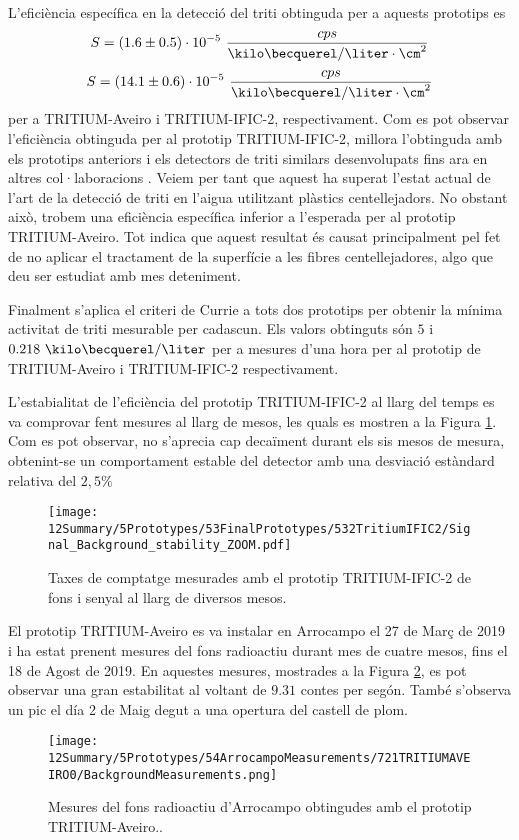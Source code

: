 L'eficiència específica en la detecció del triti obtinguda per a aquests prototips es
$$S = (1.6 \pm 0.5)\cdot{} 10^{-5}~\frac{cps}{\kilo\becquerel/\liter \cdot{} \cm^{2}}$$
$$S = (14.1 \pm 0.6)\cdot{} 10^{-5}~\frac{cps}{\kilo\becquerel/\liter \cdot{} \cm^{2}}$$
per a TRITIUM-Aveiro i TRITIUM-IFIC-2, respectivament. Com es pot observar l'eficiència obtinguda per al prototip TRITIUM-IFIC-2, millora l'obtinguda amb els prototips anteriors i els detectors de triti similars desenvolupats fins ara en altres col·laboracions \cite{Hofstetter1, Hofstetter2}. Veiem per tant que aquest ha superat l'estat actual de l'art de la detecció de triti en l'aigua utilitzant plàstics centellejadors. No obstant això, trobem una eficiència específica inferior a l'esperada per al prototip TRITIUM-Aveiro. Tot indica que aquest resultat és causat principalment pel fet de no aplicar el tractament de la superfície a les fibres centellejadores, algo que deu ser estudiat amb mes deteniment.

Finalment s'aplica el criteri de Currie \cite{Knoll} a tots dos prototips per obtenir la mínima activitat de triti mesurable per cadascun. Els valors obtinguts són $5$ i $0.218~\kilo\becquerel/\liter$ per a mesures d'una hora per al prototip de TRITIUM-Aveiro i TRITIUM-IFIC-2 respectivament. 

L'estabialitat de l'eficiència del prototip TRITIUM-IFIC-2 al llarg del temps es va comprovar fent mesures al llarg de mesos, les quals es mostren a la Figura \ref{fig:MonitoritzacioTRITIUMIFIC2}. Com es pot observar, no s'aprecia cap decaïment durant els sis mesos de mesura, obtenint-se un comportament estable del detector amb una desviació estàndard relativa del $2,5\%$

\begin{figure}[h]
\centering
\texttt{[image: 12Summary/5Prototypes/53FinalPrototypes/532TritiumIFIC2/Signal\_Background\_stability\_ZOOM.pdf]}
\caption{Taxes de comptatge mesurades amb el prototip TRITIUM-IFIC-2 de fons i senyal al llarg de diversos mesos.\label{fig:MonitoritzacioTRITIUMIFIC2}}
\end{figure}

El prototip TRITIUM-Aveiro es va instalar en Arrocampo el 27 de Març de 2019 i ha estat prenent mesures del fons radioactiu durant mes de cuatre mesos, fins el 18 de Agost de 2019. En aquestes mesures, mostrades a la Figura \ref{fig:FonsArrocampoAveiro}, es pot observar una gran estabilitat al voltant de $9.31$ contes per segón. També s'observa un pic el día 2 de Maig degut a una opertura del castell de plom.

\begin{figure}[h]
\centering
\texttt{[image: 12Summary/5Prototypes/54ArrocampoMeasurements/721TRITIUMAVEIRO0/BackgroundMeasurements.png]}
\caption{Mesures del fons radioactiu d'Arrocampo obtingudes amb el prototip TRITIUM-Aveiro.\cite{ExperimentalPaperCarlos}.\label{fig:FonsArrocampoAveiro}}
\end{figure}